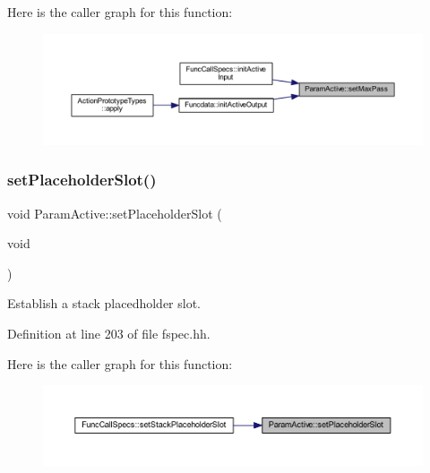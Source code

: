 Here is the caller graph for this function\+:
\nopagebreak
\begin{figure}[H]
\begin{center}
\leavevmode
\includegraphics[width=350pt]{class_param_active_ad4a9012547b34e47de3645ad5e062f4f_icgraph}
\end{center}
\end{figure}
\mbox{\label{class_param_active_ad5e20b21265e1788deb66b2f30b3b55b}} 
\subsubsection{\texorpdfstring{setPlaceholderSlot()}{setPlaceholderSlot()}}
{\footnotesize\ttfamily void Param\+Active\+::set\+Placeholder\+Slot (\begin{DoxyParamCaption}\item[{void}]{ }\end{DoxyParamCaption})\hspace{0.3cm}{\ttfamily [inline]}}



Establish a stack placedholder slot. 



Definition at line 203 of file fspec.\+hh.

Here is the caller graph for this function\+:
\nopagebreak
\begin{figure}[H]
\begin{center}
\leavevmode
\includegraphics[width=350pt]{class_param_active_ad5e20b21265e1788deb66b2f30b3b55b_icgraph}
\end{center}
\end{figure}
\mbox{\label{class_param_active_abce147faf761497f43582dbed22b57c0}} 
